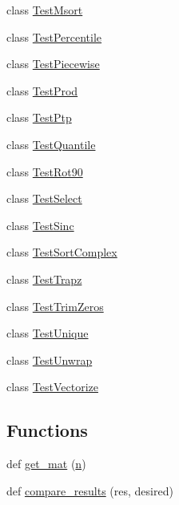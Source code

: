 \begin{DoxyCompactItemize}
\item 
class \hyperlink{classnumpy_1_1lib_1_1tests_1_1test__function__base_1_1TestMsort}{Test\+Msort}
\item 
class \hyperlink{classnumpy_1_1lib_1_1tests_1_1test__function__base_1_1TestPercentile}{Test\+Percentile}
\item 
class \hyperlink{classnumpy_1_1lib_1_1tests_1_1test__function__base_1_1TestPiecewise}{Test\+Piecewise}
\item 
class \hyperlink{classnumpy_1_1lib_1_1tests_1_1test__function__base_1_1TestProd}{Test\+Prod}
\item 
class \hyperlink{classnumpy_1_1lib_1_1tests_1_1test__function__base_1_1TestPtp}{Test\+Ptp}
\item 
class \hyperlink{classnumpy_1_1lib_1_1tests_1_1test__function__base_1_1TestQuantile}{Test\+Quantile}
\item 
class \hyperlink{classnumpy_1_1lib_1_1tests_1_1test__function__base_1_1TestRot90}{Test\+Rot90}
\item 
class \hyperlink{classnumpy_1_1lib_1_1tests_1_1test__function__base_1_1TestSelect}{Test\+Select}
\item 
class \hyperlink{classnumpy_1_1lib_1_1tests_1_1test__function__base_1_1TestSinc}{Test\+Sinc}
\item 
class \hyperlink{classnumpy_1_1lib_1_1tests_1_1test__function__base_1_1TestSortComplex}{Test\+Sort\+Complex}
\item 
class \hyperlink{classnumpy_1_1lib_1_1tests_1_1test__function__base_1_1TestTrapz}{Test\+Trapz}
\item 
class \hyperlink{classnumpy_1_1lib_1_1tests_1_1test__function__base_1_1TestTrimZeros}{Test\+Trim\+Zeros}
\item 
class \hyperlink{classnumpy_1_1lib_1_1tests_1_1test__function__base_1_1TestUnique}{Test\+Unique}
\item 
class \hyperlink{classnumpy_1_1lib_1_1tests_1_1test__function__base_1_1TestUnwrap}{Test\+Unwrap}
\item 
class \hyperlink{classnumpy_1_1lib_1_1tests_1_1test__function__base_1_1TestVectorize}{Test\+Vectorize}
\end{DoxyCompactItemize}
\subsection*{Functions}
\begin{DoxyCompactItemize}
\item 
def \hyperlink{namespacenumpy_1_1lib_1_1tests_1_1test__function__base_a936f606cbafb43b7ba26aaded951a057}{get\+\_\+mat} (\hyperlink{namespacenumpy_a352663c52853d2754274407d5cae2832}{n})
\item 
def \hyperlink{namespacenumpy_1_1lib_1_1tests_1_1test__function__base_a20e016ceb8a0b148afb9c41a78cde236}{compare\+\_\+results} (res, desired)
\end{DoxyCompactItemize}



